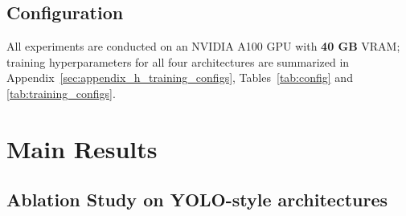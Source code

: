 \documentclass{article}
\theoremstyle{plain}
\theoremstyle{definition}
\theoremstyle{remark}
\begin{document}
 \subsection{Configuration}
 All experiments are conducted on an NVIDIA A100 GPU with \textbf{40 GB} VRAM; training hyperparameters for all four architectures are summarized in Appendix~\ref{sec:appendix_h_training_configs}, Tables~\ref{tab:config} and \ref{tab:training_configs}.

\section{Main Results}

\subsection{Ablation Study on YOLO-style architectures}
\end{document}
